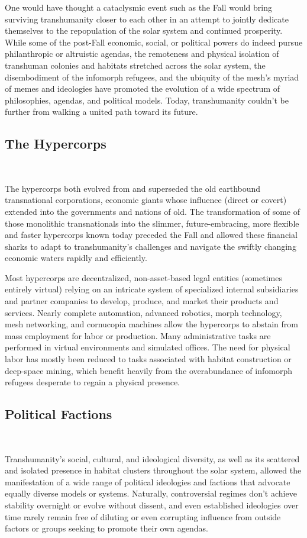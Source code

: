One would have thought a cataclysmic event such as the Fall would bring
surviving transhumanity closer to each other in an attempt to jointly
dedicate themselves to the repopulation of the solar system and continued
prosperity. While some of the post-Fall economic, social, or political powers
do indeed pursue philanthropic or altruistic agendas, the remoteness and
physical isolation of transhuman colonies and habitats stretched across the
solar system, the disembodiment of the infomorph refugees, and the ubiquity of
the mesh's myriad of memes and ideologies have promoted the evolution of a
wide spectrum of philosophies, agendas, and political models. Today,
transhumanity couldn't be further from walking a united path toward its future.

\subsection{The Hypercorps} 

The hypercorps both evolved from and superseded the old earthbound
transnational corporations, economic giants whose influence (direct or covert)
extended into the governments and nations of old. The transformation of some
of those monolithic transnationals into the slimmer, future-embracing, more
flexible and faster hypercorps known today preceded the Fall and allowed these
financial sharks to adapt to transhumanity's challenges and navigate the
swiftly changing economic waters rapidly and efficiently.

Most hypercorps are decentralized, non-asset-based legal entities (sometimes
entirely virtual) relying on an intricate system of specialized internal
subsidiaries and partner companies to develop, produce, and market their
products and services. Nearly complete automation, advanced robotics, morph
technology, mesh networking, and cornucopia machines allow the hypercorps to
abstain from mass employment for labor or production. Many administrative
tasks are performed in virtual environments and simulated offices. The need
for physical labor has mostly been reduced to tasks associated with habitat
construction or deep-space mining, which benefit heavily from the
overabundance of infomorph refugees desperate to regain a physical presence. 

\subsection{Political Factions} 

Transhumanity's social, cultural, and ideological diversity, as well as its
scattered and isolated presence in habitat clusters throughout the solar
system, allowed the manifestation of a wide range of political ideologies and
factions that advocate equally diverse models or systems. Naturally,
controversial regimes don't achieve stability overnight or evolve without
dissent, and even established ideologies over time rarely remain free of
diluting or even corrupting influence from outside factors or groups seeking
to promote their own agendas.

